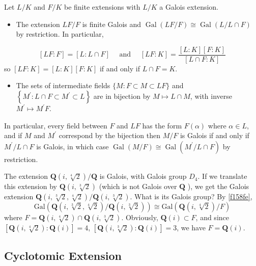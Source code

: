 \begin{theorem}[Theorem 6.6]
Let $L / K$ and $F / K$ be finite extensions with $L / K$ a Galois extension.
	\begin{itemize}
		\item The extension $L F / F$ is finite Galois and $\operatorname{Gal}(L F / F) \cong \operatorname{Gal}(L / L \cap F)$ by restriction. In particular,
	\end{itemize}
\[
[L F: F]=[L: L \cap F] \quad \text { and } \quad[L F: K]=\frac{[L: K][F: K]}{[L \cap F: K]}
\]so $[L F: K]=[L: K][F: K]$ if and only if $L \cap F=K$.
	\begin{itemize}
		\item The sets of intermediate fields $\{M: F \subset M \subset L F\}$ and $\left\{M^{\prime}: L \cap F \subset M^{\prime} \subset L\right\}$ are in bijection by $M \mapsto L \cap M$, with inverse $M^{\prime} \mapsto M^{\prime} F$.
	\end{itemize}
In particular, every field between $F$ and $L F$ has the form $F(\alpha)$ where $\alpha \in L$, and if $M$ and $M^{\prime}$ correspond by the bijection then $M / F$ is Galois if and only if $M^{\prime} / L \cap F$ is Galois, in which case $\operatorname{Gal}(M / F) \cong \operatorname{Gal}\left(M^{\prime} / L \cap F\right)$ by restriction.\label{f158fe}
\end{theorem}

The extension $\mathbf{Q}(i, \sqrt[4]{2}) / \mathbf{Q}$ is Galois, with Galois group $D_4$. If we translate this extension by $\mathbf{Q}(i, \sqrt[3]{2})$ (which is not Galois over $\mathbf{Q}$ ), we get the Galois extension $\mathbf{Q}(i, \sqrt[3]{2}, \sqrt[4]{2}) / \mathbf{Q}(i, \sqrt[3]{2})$. What is its Galois group? By \cref{f158fe},
\[
\mathrm{Gal}(\mathbf{Q}(i,\sqrt[3]{ 2 },\sqrt[4]{ 2 })/\mathbf{Q}(i,\sqrt[3]{ 2 }))\cong \mathrm{Gal}(\mathbf{Q}(i,\sqrt[4]{ 2 })/F)
\]
where $F=\mathbf{Q}(i,\sqrt[4]{ 2 })\cap \mathbf{Q}(i,\sqrt[3]{ 2 })$. Obviously, $\mathbf{Q}(i)\subset F$, and since $[\mathbf{Q}(i,\sqrt[4]{ 2 }):\mathbf{Q}(i)]=4$, $[\mathbf{Q}(i,\sqrt[3]{ 2 }):\mathbf{Q}(i)]=3$, we have $F=\mathbf{Q}(i)$.

\subsection{Cyclotomic Extension}


